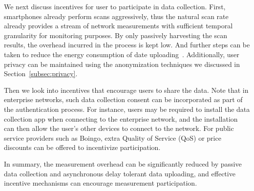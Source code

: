 We next discuss incentives for user to participate in data collection. First,
smartphones already perform \wifi{} scans aggressively, thus the natural scan
rate already provides a stream of network measurements with sufficient temporal
granularity for monitoring purposes. By only passively harvesting the scan
results, the overhead incurred in the process is kept low. And further steps can
be taken to reduce the energy consumption of date
uploading~\cite{liu2015appatp,zhang5etrain}.  Additionally, user privacy can be
maintained using the anonymization techniques we discussed in
Section~\ref{subsec:privacy}.

Then we look into incentives that encourage users to share the data. Note that
in enterprise networks, such data collection consent can be incorporated as part
of the authentication process. For instance, users may be required to install
the data collection app when connecting to the enterprise network, and the
installation can then allow the user's other devices to connect to the network.
For public \wifi{} service providers such as Boingo, extra Quality
of Service (QoS) or price discounts can be offered to incentivize
participation.

In summary, the measurement overhead can be significantly reduced by passive
data collection and asynchronous delay tolerant data uploading, and effective
incentive mechanisms can encourage measurement participation.

